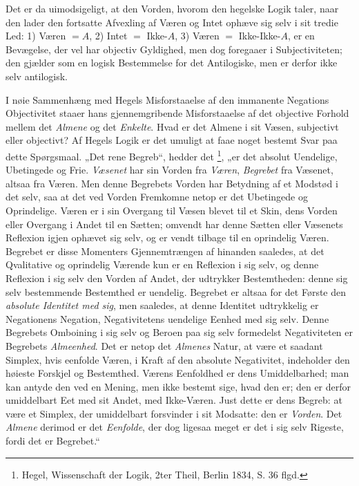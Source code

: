 \documentclass[11pt]{book}
\newcommand{\opage}[1]{\marginnote{\footnotesize\textit{[#1]}}}
\begin{document}
Det er da uimodsigeligt, at den Vorden, hvorom den hegelske Logik
taler, naar den lader den fortsatte Afvexling af Væren og Intet
ophæve sig selv i sit tredie Led: 1) Væren $= A$, 2) Intet $=$
Ikke-$A$, 3) Væren $=$ Ikke-Ikke-$A$,
\opage{151} \setcounter{footnote}{0}%
er en Bevægelse, der vel har objectiv Gyldighed, men dog foregaaer i
Subjectiviteten; den gjælder som en logisk Bestemmelse for det
Antilogiske, men er derfor ikke selv antilogisk.

I nøie Sammenhæng med Hegels Misforstaaelse af den immanente
Negations Objectivitet staaer hans gjennemgribende Misforstaaelse af
det objective Forhold mellem det \emph{Almene} og det \emph{Enkelte}.
Hvad er det Almene i sit Væsen, subjectivt eller objectivt? Af Hegels
Logik er det umuligt at faae noget bestemt Svar paa dette
Spørgsmaal. „Det rene Begreb“, hedder det%
\footnote{%
Hegel, Wissenschaft der Logik, 2ter Theil, Berlin 1834, S. 36 flgd.},
„er det absolut Uendelige, Ubetingede og Frie. \emph{Væsenet} har sin
Vorden fra \emph{Væren}, \emph{Begrebet} fra Væsenet, altsaa fra
Væren. Men denne Begrebets Vorden har Betydning af et Modstød i det
selv, saa at det ved Vorden Fremkomne netop er det Ubetingede og
Oprindelige. Væren er i sin Overgang til Væsen blevet til et Skin,
dens Vorden eller Overgang i Andet til en Sætten; omvendt har denne
Sætten eller Væsenets Reflexion igjen ophævet sig selv, og er vendt
tilbage til en oprindelig Væren. Begrebet er disse Momenters
Gjennemtrængen af hinanden saaledes, at det Qvalitative og oprindelig
Værende kun er en Reflexion i sig selv, og denne Reflexion i sig selv
den Vorden af Andet, der udtrykker Bestemtheden: denne sig selv
bestemmende Bestemthed er uendelig. Begrebet er altsaa for det Første
den \emph{absolute Identitet med sig}, men saaledes, at denne
Identitet udtrykkelig er Negationens Negation, Negativitetens
uendelige Eenhed med sig selv. Denne Begrebets
Omboining i sig selv og Beroen paa sig selv formedelst Negativiteten
er Begrebets \emph{Almeenhed}. Det er netop det \emph{Almenes} Natur,
at være et saadant Simplex, hvis eenfolde Væren, i Kraft af den
absolute Negativitet, indeholder den høieste Forskjel og Bestemthed.
Værens Eenfoldhed er dens Umiddelbarhed; man kan antyde den ved en
Mening, men ikke bestemt sige, hvad
\opage{152} \setcounter{footnote}{0}%
den er; den er derfor umiddelbart Eet med sit Andet, med Ikke-Væren.
Just dette er dens Begreb: at være et Simplex, der umiddelbart
forsvinder i sit Modsatte: den er \emph{Vorden}. Det \emph{Almene}
derimod er det \emph{Eenfolde}, der dog ligesaa meget er det i sig
selv Rigeste, fordi det er Begrebet.“
\end{document}

